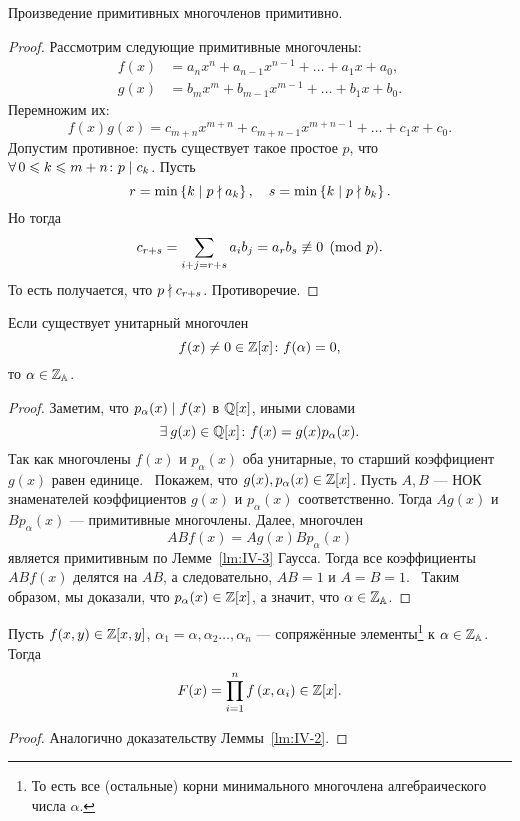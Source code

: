 \begin{nlemma}[Гаусса]
\label{lm:IV-3}
    Произведение примитивных многочленов примитивно.
\end{nlemma}
\begin{proof}
    Рассмотрим следующие примитивные многочлены:
    \begin{align*}
        f(x) &= a_nx^n + a_{n-1}x^{n-1} + \dots + a_1x + a_0, \\
        g(x) &= b_mx^m + b_{m-1}x^{m-1} + \dots + b_1x + b_0.
    \end{align*}
    Перемножим их:
    \[
        f(x)g(x) = c_{m+n}x^{m+n} + c_{m+n-1}x^{m+n-1} + \dots + c_1x + c_0.
    \]
    Допустим противное: пусть существует такое простое $p$, что $\forall 0 \le k \le m + n\colon p \divides c_k$. Пусть 
    \[
        r = \min\left\{k \mid p \nmid a_k\right\},
        \quad
        s = \min\left\{k \mid p \nmid b_k\right\}.
    \]
    Но тогда 
    \[
        c_{r+s} = \sum_{i+j=r+s} a_ib_j = a_rb_s \not\equiv 0 \pmod{p}.
    \]
    То есть получается, что $p \nmid c_{r+s}$. Противоречие.
\end{proof}

\begin{ntheorem}
\label{thm:IV-3}
    Если существует унитарный многочлен
    \[
        f(x) \ne 0 \in \mathbb{Z}[x]\colon f(\alpha) = 0,
    \]
    то $\alpha \in \mathbb{Z}_{\mathbb{A}}$.
\end{ntheorem}
\begin{proof}
    Заметим, что $p_{\alpha}(x) \mid f(x)$ в $\mathbb{Q}[x]$, иными словами
    \[
        \exists g(x) \in \QQ[x]\colon f(x) = g(x)p_{\alpha}(x).
    \]
    Так как многочлены $f(x)$ и $p_{\alpha}(x)$ оба унитарные, то старший коэффициент $g(x)$ равен единице.~\newline
    Покажем, что  $g(x), p_{\alpha}(x) \in \mathbb{Z}[x]$. Пусть $A, B$ --- НОК знаменателей коэффициентов $g(x)$ и $p_{\alpha}(x)$ соответственно. Тогда $Ag(x)$ и $Bp_{\alpha}(x)$ --- примитивные многочлены. Далее, многочлен
    \[
        ABf(x) = Ag(x)Bp_{\alpha}(x)
    \]
    является примитивным по Лемме~\ref{lm:IV-3} Гаусса. Тогда все коэффициенты $ABf(x)$ делятся на $AB$, а следовательно, $AB = 1$ и $A = B = 1$.~\newline
    Таким образом, мы доказали, что $p_{\alpha}(x) \in \mathbb{Z}[x]$, а значит, что $\alpha \in \mathbb{Z}_{\mathbb{A}}$.
\end{proof}

\begin{nlemma}
\label{lm:IV-4}
    Пусть $f(x, y) \in \mathbb{Z}[x, y]$, $\alpha_1 = \alpha, \alpha_2 \dots, \alpha_n$ --- сопряжённые элементы\footnote{То есть все (остальные) корни минимального многочлена алгебраического числа $\alpha$.} к $\alpha \in \mathbb{Z}_{\mathbb{A}}$. Тогда
    \[
        F(x) = \prod_{i=1}^{n} f\left(x, \alpha_i\right) \in \mathbb{Z}[x].
    \]
\end{nlemma}
\begin{proof}
    Аналогично доказательству Леммы~\ref{lm:IV-2}.
\end{proof}

